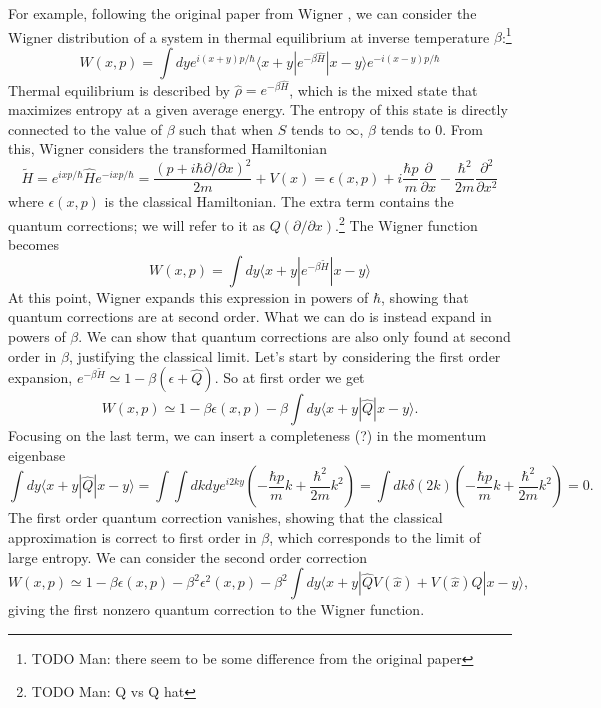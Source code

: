 \documentclass{article}
\begin{document}
For example, following the original paper from Wigner \cite{WignerLimit}, we can consider the Wigner distribution of a system in thermal equilibrium at inverse temperature $\beta$:\footnote{TODO Man: there seem to be some difference from the original paper}
\begin{equation}
    W(x,p)=\int dy e^{i(x+y)p/\hbar}\langle x+y |e^{-\beta\hat{H}}|x-y \rangle e^{-i(x-y)p/\hbar}
\end{equation}
Thermal equilibrium is described by $\hat{\rho}=e^{-\beta \hat{H}}$, which is the mixed state that maximizes entropy at a given average energy. The entropy of this state is directly connected to the value of $\beta$ such that when $S$ tends to $\infty$, $\beta$ tends to 0.
From this, Wigner considers the transformed Hamiltonian
\begin{equation}
    \tilde{H}=e^{i x p/\hbar}\hat{H} e^{-i x p/\hbar}=\frac{(p+i\hbar\partial/\partial x)^2}{2m}+V(x)=\epsilon(x,p)+i\frac{\hbar p}{m}\frac{\partial}{\partial x}-\frac{\hbar^2}{2m}\frac{\partial^2}{\partial x^2}
\end{equation}
where $\epsilon(x,p)$ is the classical Hamiltonian. The extra term contains the quantum corrections; we will refer to it as $Q(\partial/\partial x)$.\footnote{TODO Man: Q vs Q hat} The Wigner function becomes
\begin{equation}
    W(x,p)=\int dy \langle x+y |e^{-\beta\tilde{H}}|x-y \rangle 
\end{equation}
At this point, Wigner expands this expression in powers of $\hbar$, showing that quantum corrections are at second order. What we can do is instead expand in powers of $\beta$. We can show that quantum corrections are also only found at second order in $\beta$, justifying the classical limit. Let's start by considering the first order expansion, $e^{-\beta\tilde{H}}\simeq 1-\beta(\epsilon+\hat{Q})$. So at first order
we get
\begin{equation}
    W(x,p)\simeq 1-\beta \epsilon(x,p)-\beta\int dy\langle x+y |\hat{Q}|x-y \rangle.
\end{equation}
Focusing on the last term, we can insert a completeness (?) in the momentum eigenbase
\begin{equation}
  \int dy\langle x+y |\hat{Q}|x-y \rangle=\int\int dkdy e^{i2ky} \left(-\frac{\hbar p}{m}k+\frac{\hbar^2}{2m}k^2\right)=\int dk \delta(2k) \left(-\frac{\hbar p}{m}k+\frac{\hbar^2}{2m}k^2\right)=0.
\end{equation}
The first order quantum correction vanishes, showing that the classical approximation is correct to first order in $\beta$, which corresponds to the limit of large entropy. We can consider the second order correction
\begin{equation}
     W(x,p)\simeq 1-\beta \epsilon(x,p)-\beta^2\epsilon^2(x,p)-\beta^2\int dy\langle x+y |\hat{Q}V(\hat{x})+V(\hat{x}) \hat{Q}|x-y \rangle,
\end{equation}
giving the first nonzero quantum correction to the Wigner function.
\end{document}

